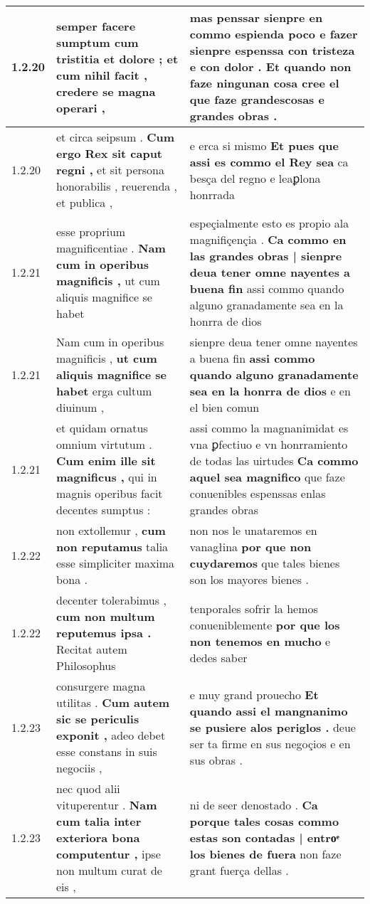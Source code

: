 \begin{tabular}{|p{1cm}|p{6.5cm}|p{6.5cm}|}
1.2.20 & semper facere sumptum \textbf{ cum tristitia et dolore ; et cum nihil facit , } credere se magna operari , & mas penssar sienpre en commo espienda poco e fazer sienpre espenssa con tristeza e con dolor . \textbf{ Et quando non faze ningunan cosa cree el } que faze grandescosas e grandes obras . \\\hline
1.2.20 & et circa seipsum . \textbf{ Cum ergo Rex sit caput regni , } et sit persona honorabilis , reuerenda , et publica , & e erca si mismo \textbf{ Et pues que assi es commo el Rey sea } ca besça del regno e leaꝑlona honrrada \\\hline
1.2.21 & esse proprium magnificentiae . \textbf{ Nam cum in operibus magnificis , } ut cum aliquis magnifice se habet & espeçialmente esto es propio ala magnifiçençia . \textbf{ Ca commo en las grandes obras | sienpre deua tener omne nayentes a buena fin } assi commo quando alguno granadamente sea en la honrra de dios \\\hline
1.2.21 & Nam cum in operibus magnificis , \textbf{ ut cum aliquis magnifice se habet } erga cultum diuinum , & sienpre deua tener omne nayentes a buena fin \textbf{ assi commo quando alguno granadamente sea en la honrra de dios } e en el bien comun \\\hline
1.2.21 & et quidam ornatus omnium virtutum . \textbf{ Cum enim ille sit magnificus , } qui in magnis operibus facit decentes sumptus : & assi commo la magnanimidat es vna ꝑfectiuo e vn honrramiento de todas las uirtudes \textbf{ Ca commo aquel sea magnifico } que faze conuenibles espenssas enlas grandes obras \\\hline
1.2.22 & non extollemur , \textbf{ cum non reputamus } talia esse simpliciter maxima bona . & non nos le unataremos en vanagłina \textbf{ por que non cuydaremos } que tales bienes son los mayores bienes . \\\hline
1.2.22 & decenter tolerabimus , \textbf{ cum non multum reputemus ipsa . } Recitat autem Philosophus & tenporales sofrir la hemos conueniblemente \textbf{ por que los non tenemos en mucho } e dedes saber \\\hline
1.2.23 & consurgere magna utilitas . \textbf{ Cum autem sic se periculis exponit , } adeo debet esse constans in suis negociis , & e muy grand prouecho \textbf{ Et quando assi el mangnanimo se pusiere alos periglos . } deue ser ta firme en sus negoçios e en sus obras . \\\hline
1.2.23 & nec quod alii vituperentur . \textbf{ Nam cum talia inter exteriora bona computentur , } ipse non multum curat de eis , & ni de seer denostado . \textbf{ Ca porque tales cosas commo estas son contadas | entroͤ los bienes de fuera } non faze grant fuerça dellas . \\\hline

\end{tabular}
